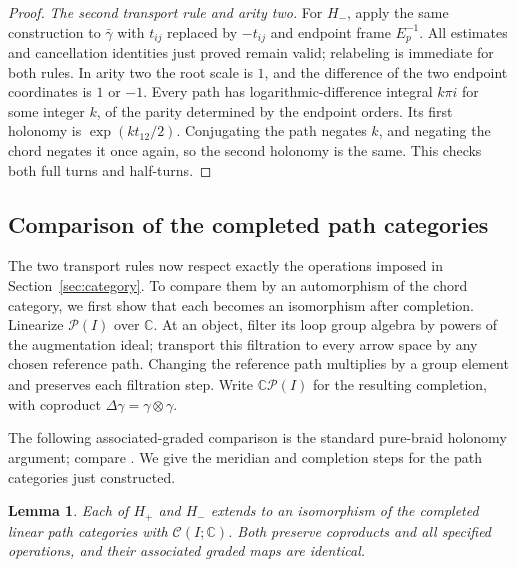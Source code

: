 \documentclass[11pt]{article}
\newcommand{\CC}{\mathbb C}
\newtheorem{lemma}[theorem]{Lemma}
\theoremstyle{definition}
\theoremstyle{remark}
\numberwithin{equation}{section}
\begin{document}
\begin{proof}
\emph{The second transport rule and arity two.}
For $H_-$, apply the same construction to $\bar\gamma$ with
$t_{ij}$ replaced by $-t_{ij}$ and endpoint frame $E_p^{-1}$.
All estimates and cancellation identities just proved remain valid;
relabeling is immediate for both rules.  In arity two the root scale
is $1$, and the difference of the two endpoint coordinates is $1$ or
$-1$.  Every path has logarithmic-difference integral $k\pi i$ for
some integer $k$, of the parity determined by the endpoint orders.
Its first holonomy is $\exp(kt_{12}/2)$.  Conjugating the path negates
$k$, and negating the chord negates it once again, so the second
holonomy is the same.  This checks both full turns and half-turns.
\end{proof}

\subsection{Comparison of the completed path categories}
The two transport rules now respect exactly the operations imposed in
Section~\ref{sec:category}.  To compare them by an automorphism of the
chord category, we first show that each becomes an isomorphism after
completion.
Linearize $\mathcal P(I)$ over $\CC$.
At an object, filter its loop group algebra by powers
of the augmentation ideal; transport this filtration to every arrow
space by any chosen reference path.  Changing the reference path
multiplies by a group element and preserves each filtration step.
Write $\widehat{\CC\mathcal P(I)}$ for the resulting completion, with
coproduct $\Delta\gamma=\gamma\otimes\gamma$.

The following associated-graded comparison is the standard pure-braid
holonomy argument; compare \cite[Proposition~3.6]{BarNatan}.
We give the meridian and completion steps for the path categories just
constructed.

\begin{lemma}\label{lem:holonomy-isomorphism}
Each of $H_+$ and $H_-$ extends to an isomorphism of the completed
linear path categories with $\mathcal C(I;\CC)$.  Both preserve
coproducts and all specified operations, and their associated graded
maps are identical.
\end{lemma}
\end{document}
